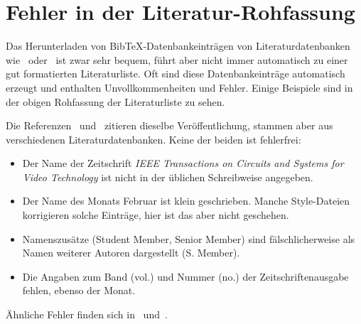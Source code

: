 \documentclass[a4paper, 10pt]{article}
\begin{document}
\renewcommand\refname{Literatur-Rohfassung}

\renewcommand\refname{Literatur}


\section{Fehler in  der Literatur-Rohfassung}

Das Herunterladen von BibTeX-Datenbankeintr\"agen von Literaturdatenbanken
wie~\cite{IEEE:Xplore:2011} oder~\cite{CiteSeer:2011} ist zwar sehr bequem, f\"uhrt aber
nicht immer automatisch zu einer gut formatierten Literaturliste. Oft sind diese
Datenbankeintr\"age automatisch erzeugt und enthalten Unvollkommenheiten und Fehler.
Einige Beispiele sind in der obigen Rohfassung der Literaturliste zu sehen.

Die Referenzen~\cite{4703235} und~\cite{Li09laplacedistribution} zitieren dieselbe
Ver\"offentlichung, stammen aber aus verschiedenen Literaturdatenbanken. Keine der beiden ist
fehlerfrei:

\begin{description}
 \item[\cite{4703235}]
  \begin{itemize}
  \item
  Der Name der Zeitschrift \emph{IEEE Transactions on Circuits and Systems for Video Technology} ist
  nicht in der \"ublichen Schreibweise angegeben. 
  \item 
  Der Name des Monats Februar ist klein geschrieben. Manche Style-Dateien korrigieren solche
  Eintr\"age, hier ist das aber nicht geschehen.
  \end{itemize}
 \item[\cite{Li09laplacedistribution}]
  \begin{itemize}
  \item 
  Namenszus\"atze (Student Member, Senior Member) sind f\"alschlicherweise als Namen weiterer
Autoren dargestellt  (S. Member).
  \item
  Die Angaben zum Band (vol.) und Nummer (no.) der Zeitschriftenausgabe fehlen, ebenso der Monat.
 \end{itemize}
 \end{description} 
\"Ahnliche Fehler finden sich in~\cite{5428855} und~\cite{5463320}.
\end{document}
